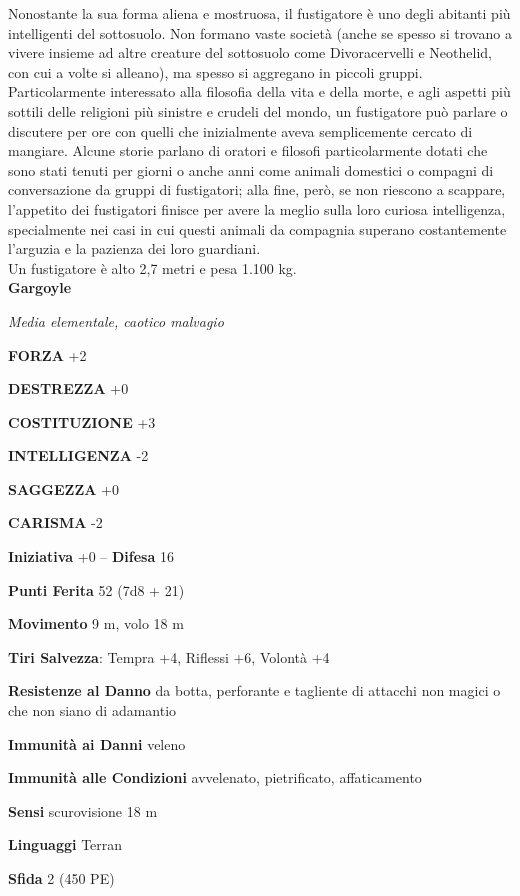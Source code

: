 \begin{multicols}{2}
Nonostante la sua forma aliena e mostruosa, il fustigatore è uno degli abitanti più intelligenti del sottosuolo. Non formano vaste società (anche se spesso si trovano a vivere insieme ad altre creature del sottosuolo come Divoracervelli e Neothelid, con cui a volte si alleano), ma spesso si aggregano in piccoli gruppi. Particolarmente interessato alla filosofia della vita e della morte, e agli aspetti più sottili delle religioni più sinistre e crudeli del mondo, un fustigatore può parlare o discutere per ore con quelli che inizialmente aveva semplicemente cercato di mangiare. Alcune storie parlano di oratori e filosofi particolarmente dotati che sono stati tenuti per giorni o anche anni come animali domestici o compagni di conversazione da gruppi di fustigatori; alla fine, però, se non riescono a scappare, l'appetito dei fustigatori finisce per avere la meglio sulla loro curiosa intelligenza, specialmente nei casi in cui questi animali da compagnia superano costantemente l'arguzia e la pazienza dei loro guardiani.\\
Un fustigatore è alto 2,7 metri e pesa 1.100 kg.\\


\medskip{}\textbf{Gargoyle}

\emph{Media elementale, caotico malvagio}

\textbf{FORZA} +2

\textbf{DESTREZZA} +0

\textbf{COSTITUZIONE} +3

\textbf{INTELLIGENZA} -2

\textbf{SAGGEZZA} +0

\textbf{CARISMA} -2

\textbf{Iniziativa} +0 -- \textbf{Difesa} 16

\textbf{Punti Ferita} 52 (7d8 + 21)

\textbf{Movimento} 9 m, volo 18 m

\textbf{Tiri Salvezza}: Tempra +4, Riflessi +6, Volontà +4

\textbf{Resistenze al Danno} da botta, perforante e tagliente di attacchi non magici o che non siano di adamantio

\textbf{Immunità ai Danni} veleno

\textbf{Immunità alle Condizioni} avvelenato, pietrificato, affaticamento

\textbf{Sensi} scurovisione 18 m

\textbf{Linguaggi} Terran

\textbf{Sfida} 2 (450 PE)


\end{multicols}
